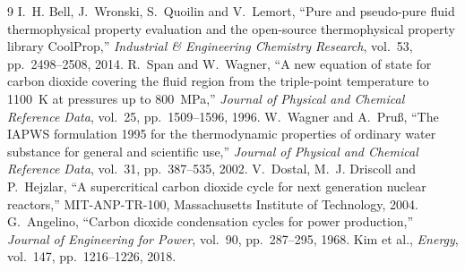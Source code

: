 \begin{thebibliography}{9}
 I.~H. Bell, J.~Wronski, S.~Quoilin and V.~Lemort, ``Pure and pseudo-pure fluid thermophysical property evaluation and the open-source thermophysical property library CoolProp,'' \emph{Industrial \& Engineering Chemistry Research}, vol.~53, pp.~2498--2508, 2014.
 R.~Span and W.~Wagner, ``A new equation of state for carbon dioxide covering the fluid region from the triple-point temperature to 1100~K at pressures up to 800~MPa,'' \emph{Journal of Physical and Chemical Reference Data}, vol.~25, pp.~1509--1596, 1996.
 W.~Wagner and A.~Pru{\ss}, ``The IAPWS formulation 1995 for the thermodynamic properties of ordinary water substance for general and scientific use,'' \emph{Journal of Physical and Chemical Reference Data}, vol.~31, pp.~387--535, 2002.
 V.~Dostal, M.~J. Driscoll and P.~Hejzlar, ``A supercritical carbon dioxide cycle for next generation nuclear reactors,'' MIT-ANP-TR-100, Massachusetts Institute of Technology, 2004.
 G.~Angelino, ``Carbon dioxide condensation cycles for power production,'' \emph{Journal of Engineering for Power}, vol.~90, pp.~287--295, 1968.
 Kim et al., \emph{Energy}, vol.~147, pp.~1216--1226, 2018.
\end{thebibliography}
